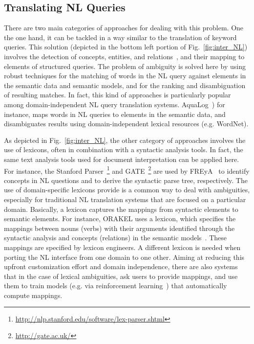 \subsection{Translating NL Queries} There are two main categories of approaches for dealing with this problem. One the one hand, it can be tackled in a way similar to the translation of keyword queries. This solution (depicted in the bottom left portion of Fig.~\ref{fig:inter_NL}) involves the detection of concepts, entities, and relations~\cite{DBLP:conf/aswc/CaoCT08}, and their mapping to elements of structured queries. The problem of ambiguity is solved here by using robust techniques for the matching of words in the NL query against elements in the semantic data and semantic models, and for the ranking and disambiguation of resulting matches. In fact, this kind of approaches is particularly popular among domain-independent NL query translation systems. AquaLog~\cite{DBLP:journals/ws/LopezUMP07}) for instance, maps words in NL queries to elements in the semantic data, and disambiguates results using domain-independent lexical resources (e.g. WordNet). 

As depicted in Fig.~\ref{fig:inter_NL}, the other category of approaches involves the use of lexicons, often in combination with a syntactic analysis tools. 
In fact, the same text analysis tools used for document interpretation can be applied here. For instance, the Stanford Parser~\footnote{\url{http://nlp.stanford.edu/software/lex-parser.shtml}} and GATE~\footnote{\url{http://gate.ac.uk/}} are used by FREyA~\cite{DBLP:conf/esws/DamljanovicAC10} to identify concepts in NL questions and to derive the syntactic parse tree, respectively. The use of domain-specific lexicons provide is a common way to deal with ambiguities, especially for traditional NL translation systems that are focused on a particular domain. Basically, a lexicon captures the mappings from syntactic elements to semantic elements. For instance, ORAKEL uses a lexicon, which specifies the mappings between nouns (verbs) with their arguments identified through the syntactic analysis and concepts (relations) in the semantic models~\cite{DBLP:journals/dke/CimianoHHMS08}. These mappings are specified by lexicon engineers. A different lexicon is needed when porting the NL interface from one domain to one other. Aiming at reducing this upfront customization effort and domain independence, there are also systems that in the case of lexical ambiguities, ask users to provide mappings, and use them to train models (e.g. via reinforcement learning~\cite{DBLP:conf/esws/DamljanovicAC10}) that automatically compute mappings. 

